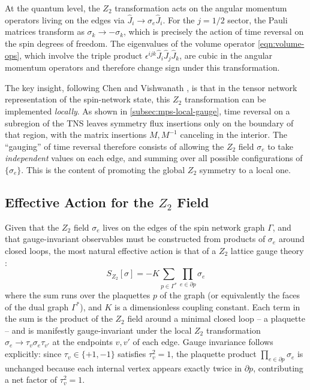 At the quantum level, the $ Z_2 $ transformation acts on the angular momentum operators living on the edges via $ \hat J_i \rightarrow \sigma_e \hat J_i $. For the $ j = 1/2 $ sector, the Pauli matrices transform as $ \sigma_k \rightarrow -\sigma_k $, which is precisely the action of time reversal on the spin degrees of freedom. The eigenvalues of the volume operator \eqref{eqn:volume-ops}, which involve the triple product $ \epsilon^{ijk} \hat J_i \hat J_j \hat J_k $, are cubic in the angular momentum operators and therefore change sign under this transformation.

The key insight, following Chen and Vishwanath \cite{Chen2015Gauging}, is that in the tensor network representation of the spin-network state, this $ Z_2 $ transformation can be implemented \emph{locally}. As shown in \autoref{subsec:mps-local-gauge}, time reversal on a subregion of the TNS leaves symmetry flux insertions only on the boundary of that region, with the matrix insertions $ M, M^{-1} $ canceling in the interior. The ``gauging'' of time reversal therefore consists of allowing the $ Z_2 $ field $ \sigma_e $ to take \emph{independent} values on each edge, and summing over all possible configurations of $ \{\sigma_e\} $. This is the content of promoting the global $ Z_2 $ symmetry to a local one.

\subsection{Effective Action for the $ Z_2 $ Field}\label{subsec:z2-effective-action}

Given that the $ Z_2 $ field $ \sigma_e $ lives on the edges of the spin network graph $ \Gamma $, and that gauge-invariant observables must be constructed from products of $ \sigma_e $ around closed loops, the most natural effective action is that of a $ Z_2 $ lattice gauge theory \cite{Wegner1971Duality,Kogut1979An-introduction}:
\begin{equation}\label{eqn:z2-gauge-action}
	S_{Z_2}[\sigma] = -K \sum_{p \in \Gamma^*} \prod_{e \in \partial p} \sigma_e
\end{equation}
where the sum runs over the plaquettes $ p $ of the graph (or equivalently the faces of the dual graph $ \Gamma^* $), and $ K $ is a dimensionless coupling constant. Each term in the sum is the product of the $ Z_2 $ field around a minimal closed loop -- a plaquette -- and is manifestly gauge-invariant under the local $ Z_2 $ transformation $ \sigma_e \rightarrow \tau_v \sigma_e \tau_{v'} $ at the endpoints $ v, v' $ of each edge. Gauge invariance follows explicitly: since $ \tau_v \in \{+1,-1\} $ satisfies $ \tau_v^2 = 1 $, the plaquette product $ \prod_{e \in \partial p} \sigma_e $ is unchanged because each internal vertex appears exactly twice in $ \partial p $, contributing a net factor of $ \tau_v^2 = 1 $.

